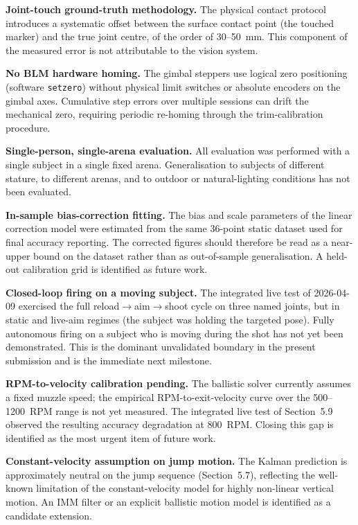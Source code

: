 \textbf{Joint-touch ground-truth methodology.} The physical contact protocol introduces a systematic offset between the surface contact point (the touched marker) and the true joint centre, of the order of 30--50~mm. This component of the measured error is not attributable to the vision system.

\textbf{No BLM hardware homing.} The gimbal steppers use logical zero positioning (software \texttt{setzero}) without physical limit switches or absolute encoders on the gimbal axes. Cumulative step errors over multiple sessions can drift the mechanical zero, requiring periodic re-homing through the trim-calibration procedure.

\textbf{Single-person, single-arena evaluation.} All evaluation was performed with a single subject in a single fixed arena. Generalisation to subjects of different stature, to different arenas, and to outdoor or natural-lighting conditions has not been evaluated.

\textbf{In-sample bias-correction fitting.} The bias and scale parameters of the linear correction model were estimated from the same 36-point static dataset used for final accuracy reporting. The corrected figures should therefore be read as a near-upper bound on the dataset rather than as out-of-sample generalisation. A held-out calibration grid is identified as future work.

\textbf{Closed-loop firing on a moving subject.} The integrated live test of 2026-04-09 exercised the full reload$\to$aim$\to$shoot cycle on three named joints, but in static and live-aim regimes (the subject was holding the targeted pose). Fully autonomous firing on a subject who is moving during the shot has not yet been demonstrated. This is the dominant unvalidated boundary in the present submission and is the immediate next milestone.

\textbf{RPM-to-velocity calibration pending.} The ballistic solver currently assumes a fixed muzzle speed; the empirical RPM-to-exit-velocity curve over the 500--1200~RPM range is not yet measured. The integrated live test of Section~5.9 observed the resulting accuracy degradation at 800~RPM. Closing this gap is identified as the most urgent item of future work.

\textbf{Constant-velocity assumption on jump motion.} The Kalman prediction is approximately neutral on the jump sequence (Section~5.7), reflecting the well-known limitation of the constant-velocity model for highly non-linear vertical motion. An IMM filter or an explicit ballistic motion model is identified as a candidate extension.

